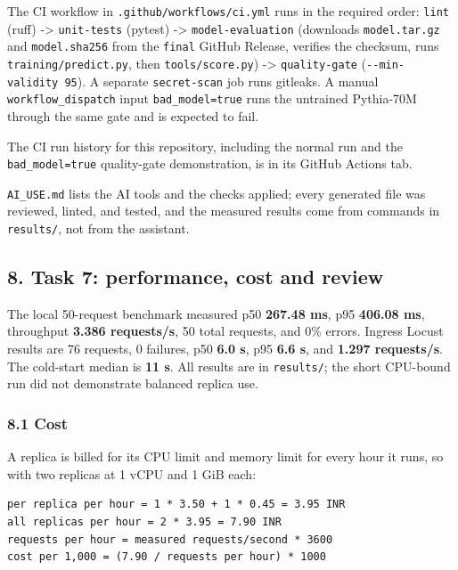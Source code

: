 \documentclass[
]{article}
\begin{document}
The CI workflow in \texttt{.github/workflows/ci.yml} runs in the
required order: \texttt{lint} (ruff) -\textgreater{} \texttt{unit-tests}
(pytest) -\textgreater{} \texttt{model-evaluation} (downloads
\texttt{model.tar.gz} and \texttt{model.sha256} from the \texttt{final}
GitHub Release, verifies the checksum, runs
\texttt{training/predict.py}, then \texttt{tools/score.py})
-\textgreater{} \texttt{quality-gate} (\texttt{-\/-min-validity\ 95}). A
separate \texttt{secret-scan} job runs gitleaks. A manual
\texttt{workflow\_dispatch} input \texttt{bad\_model=true} runs the
untrained Pythia-70M through the same gate and is expected to fail.

The CI run history for this repository, including the normal run and the
\texttt{bad\_model=true} quality-gate demonstration, is in its GitHub
Actions tab.

\texttt{AI\_USE.md} lists the AI tools and the checks applied; every
generated file was reviewed, linted, and tested, and the measured
results come from commands in \texttt{results/}, not from the assistant.

\hypertarget{task-7-performance-cost-and-review}{%
\subsection{8. Task 7: performance, cost and
review}\label{task-7-performance-cost-and-review}}

The local 50-request benchmark measured p50 \textbf{267.48 ms}, p95
\textbf{406.08 ms}, throughput \textbf{3.386 requests/s}, 50 total
requests, and 0\% errors. Ingress Locust results are 76 requests, 0
failures, p50 \textbf{6.0 s}, p95 \textbf{6.6 s}, and \textbf{1.297
requests/s}. The cold-start median is \textbf{11 s}. All results are in
\texttt{results/}; the short CPU-bound run did not demonstrate balanced
replica use.

\hypertarget{cost}{%
\subsubsection{8.1 Cost}\label{cost}}

A replica is billed for its CPU limit and memory limit for every hour it
runs, so with two replicas at 1 vCPU and 1 GiB each:

\begin{verbatim}
per replica per hour = 1 * 3.50 + 1 * 0.45 = 3.95 INR
all replicas per hour = 2 * 3.95 = 7.90 INR
requests per hour = measured requests/second * 3600
cost per 1,000 = (7.90 / requests per hour) * 1000
\end{verbatim}
\end{document}
